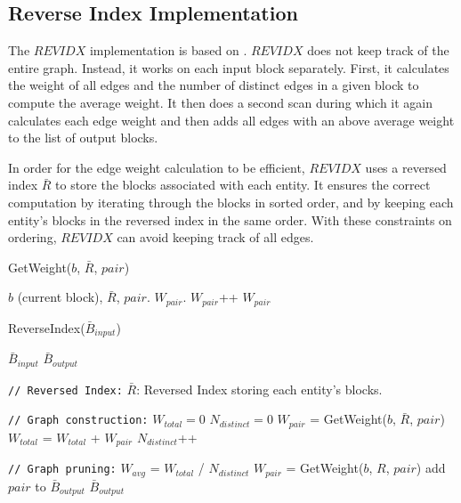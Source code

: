 \documentclass[a4paper,12pt]{article}
\begin{document}
\newpage
\subsection{Reverse Index Implementation}
The $REVIDX$ implementation is based on \cite{10.1109/TKDE.2013.54}. $REVIDX$ does not keep track of the entire graph. Instead, it works on each input block separately. First, it calculates the weight of all edges and the number of distinct edges in a given block to compute the average weight. It then does a second scan during which it again calculates each edge weight and then adds all edges with an above average weight to the list of output blocks.

In order for the edge weight calculation to be efficient, $REVIDX$ uses a reversed index $\bar R$ to store the blocks associated with each entity. It ensures the correct computation by iterating through the blocks in sorted order, and by keeping each entity's blocks in the reversed index in the same order. With these constraints on ordering, $REVIDX$ can avoid keeping track of all edges.

\begin{algorithm}[H]
\caption{{\sc GetWeight($b$, $\bar R$, $pair$)}}
\begin{algorithmic}
\REQUIRE $b$ (current block), $\bar R$, $pair$.
\ENSURE $W_{pair}$.
        \STATE $W_{pair}$++
      \ELSE
      \ENDIF
    \ENDFOR
  \ENDFOR
  \RETURN $W_{pair}$
\end{algorithmic}
\end{algorithm}

\begin{algorithm}[H]
\caption{{\sc ReverseIndex($\bar B_{input}$)}}
\begin{algorithmic}
\REQUIRE $\bar B_{input}$
\ENSURE $\bar B_{output}$

\STATE \texttt{// Reversed Index:}
\STATE $\bar R$: Reversed Index storing each entity's blocks.

\STATE \texttt{// Graph construction:}
\STATE $W_{total} = 0$
\STATE $N_{distinct} = 0$
    \STATE $W_{pair}$ = GetWeight($b$, $\bar R$, $pair$)
      \STATE $W_{total}$ = $W_{total}$ + $W_{pair}$
      \STATE $N_{distinct}$++
    \ENDIF
  \ENDFOR
\ENDFOR

\STATE \texttt{// Graph pruning:}
\STATE $W_{avg}$ = $W_{total}$ / $N_{distinct}$
    \STATE $W_{pair}$ = GetWeight($b$, $R$, $pair$)
      \STATE add $pair$ to $\bar B_{output}$
    \ENDIF
  \ENDFOR
\ENDFOR
\RETURN $\bar B_{output}$ \\
\end{algorithmic}
\end{algorithm}
\end{document}
